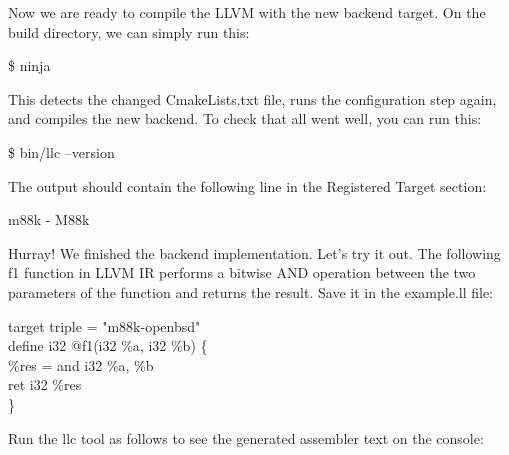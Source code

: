 Now we are ready to compile the LLVM with the new backend target. On the build directory, we can simply run this:\par

\begin{tcolorbox}[colback=white,colframe=black]
\$ ninja
\end{tcolorbox}

This detects the changed CmakeLists.txt file, runs the configuration step again, and compiles the new backend. To check that all went well, you can run this:\par

\begin{tcolorbox}[colback=white,colframe=black]
\$ bin/llc –version
\end{tcolorbox}

The output should contain the following line in the Registered Target section:\par

\begin{tcolorbox}[colback=white,colframe=black]
m88k   \hspace{2cm} - M88k
\end{tcolorbox}

Hurray! We finished the backend implementation. Let's try it out. The following f1 function in LLVM IR performs a bitwise AND operation between the two parameters of the function and returns the result. Save it in the example.ll file:\par

\begin{tcolorbox}[colback=white,colframe=black]
target triple = "m88k-openbsd" \\
define i32 @f1(i32 \%a, i32 \%b) \{ \\
\hspace*{0.5cm}\%res = and i32 \%a, \%b \\
\hspace*{0.5cm}ret i32 \%res \\
\}
\end{tcolorbox}

Run the llc tool as follows to see the generated assembler text on the console:\par

